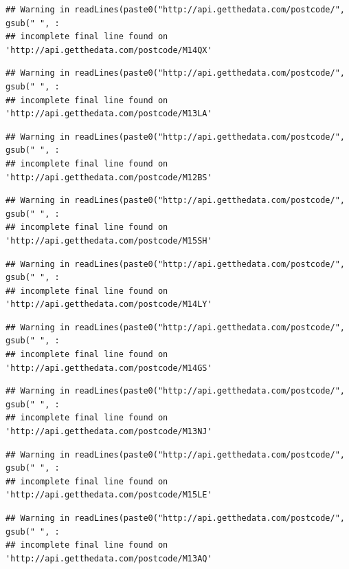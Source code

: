 \documentclass[]{book}
\begin{document}
\begin{verbatim}
## Warning in readLines(paste0("http://api.getthedata.com/postcode/", gsub(" ", :
## incomplete final line found on 'http://api.getthedata.com/postcode/M14QX'
\end{verbatim}

\begin{verbatim}
## Warning in readLines(paste0("http://api.getthedata.com/postcode/", gsub(" ", :
## incomplete final line found on 'http://api.getthedata.com/postcode/M13LA'
\end{verbatim}

\begin{verbatim}
## Warning in readLines(paste0("http://api.getthedata.com/postcode/", gsub(" ", :
## incomplete final line found on 'http://api.getthedata.com/postcode/M12BS'
\end{verbatim}

\begin{verbatim}
## Warning in readLines(paste0("http://api.getthedata.com/postcode/", gsub(" ", :
## incomplete final line found on 'http://api.getthedata.com/postcode/M15SH'
\end{verbatim}

\begin{verbatim}
## Warning in readLines(paste0("http://api.getthedata.com/postcode/", gsub(" ", :
## incomplete final line found on 'http://api.getthedata.com/postcode/M14LY'
\end{verbatim}

\begin{verbatim}
## Warning in readLines(paste0("http://api.getthedata.com/postcode/", gsub(" ", :
## incomplete final line found on 'http://api.getthedata.com/postcode/M14GS'
\end{verbatim}

\begin{verbatim}
## Warning in readLines(paste0("http://api.getthedata.com/postcode/", gsub(" ", :
## incomplete final line found on 'http://api.getthedata.com/postcode/M13NJ'
\end{verbatim}

\begin{verbatim}
## Warning in readLines(paste0("http://api.getthedata.com/postcode/", gsub(" ", :
## incomplete final line found on 'http://api.getthedata.com/postcode/M15LE'
\end{verbatim}

\begin{verbatim}
## Warning in readLines(paste0("http://api.getthedata.com/postcode/", gsub(" ", :
## incomplete final line found on 'http://api.getthedata.com/postcode/M13AQ'
\end{verbatim}
\end{document}

